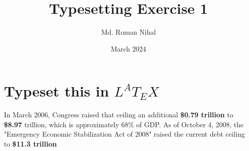 \documentclass{report}
\title{Typesetting Exercise 1}
\author{Md. Roman Nihal}
\date{March 2024}
\begin{document}
\maketitle
\tableofcontents
\newpage
{}
\section{Typeset this in $L^AT_EX$}
In March 2006, Congress raised that ceiling an additional \textbf{\$0.79 trillion} to \textbf{\$8.97} trillion, which is approximately 68\% of GDP. As of October 4, 2008, the "Emergency Economic Stabilization Act of 2008" raised the current debt ceiling to \textbf{\$11.3 trillion}
\end{document}
